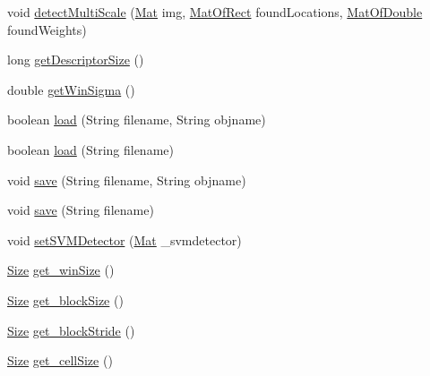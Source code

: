 \begin{DoxyCompactItemize}
\item 
void \mbox{\hyperlink{classorg_1_1opencv_1_1objdetect_1_1_h_o_g_descriptor_a0792b6a9193c0bddb4d8a33b54c466f1}{detect\+Multi\+Scale}} (\mbox{\hyperlink{classorg_1_1opencv_1_1core_1_1_mat}{Mat}} img, \mbox{\hyperlink{classorg_1_1opencv_1_1core_1_1_mat_of_rect}{Mat\+Of\+Rect}} found\+Locations, \mbox{\hyperlink{classorg_1_1opencv_1_1core_1_1_mat_of_double}{Mat\+Of\+Double}} found\+Weights)
\item 
long \mbox{\hyperlink{classorg_1_1opencv_1_1objdetect_1_1_h_o_g_descriptor_abb6efea36d4eb6d8d7f90d1525607210}{get\+Descriptor\+Size}} ()
\item 
double \mbox{\hyperlink{classorg_1_1opencv_1_1objdetect_1_1_h_o_g_descriptor_a811c982f6e07fbd77b6108afd9d6359c}{get\+Win\+Sigma}} ()
\item 
boolean \mbox{\hyperlink{classorg_1_1opencv_1_1objdetect_1_1_h_o_g_descriptor_ac381a148646d8c5a288b455bf3fb2564}{load}} (String filename, String objname)
\item 
boolean \mbox{\hyperlink{classorg_1_1opencv_1_1objdetect_1_1_h_o_g_descriptor_ab2806693fd58b1d2fa516c8c83a29225}{load}} (String filename)
\item 
void \mbox{\hyperlink{classorg_1_1opencv_1_1objdetect_1_1_h_o_g_descriptor_abe9384643a31fac6dc886b801a2fb15f}{save}} (String filename, String objname)
\item 
void \mbox{\hyperlink{classorg_1_1opencv_1_1objdetect_1_1_h_o_g_descriptor_ad6bb39073db4e5da7401f8f7338f1c36}{save}} (String filename)
\item 
void \mbox{\hyperlink{classorg_1_1opencv_1_1objdetect_1_1_h_o_g_descriptor_add61bdd56b6d457cc5b9355fa555a384}{set\+S\+V\+M\+Detector}} (\mbox{\hyperlink{classorg_1_1opencv_1_1core_1_1_mat}{Mat}} \+\_\+svmdetector)
\item 
\mbox{\hyperlink{classorg_1_1opencv_1_1core_1_1_size}{Size}} \mbox{\hyperlink{classorg_1_1opencv_1_1objdetect_1_1_h_o_g_descriptor_af357f403e6c033e1555d2332b315ee57}{get\+\_\+win\+Size}} ()
\item 
\mbox{\hyperlink{classorg_1_1opencv_1_1core_1_1_size}{Size}} \mbox{\hyperlink{classorg_1_1opencv_1_1objdetect_1_1_h_o_g_descriptor_adecd55f3c1025e3395ef576ff2a1bb47}{get\+\_\+block\+Size}} ()
\item 
\mbox{\hyperlink{classorg_1_1opencv_1_1core_1_1_size}{Size}} \mbox{\hyperlink{classorg_1_1opencv_1_1objdetect_1_1_h_o_g_descriptor_a56d8676505cc47ed53eb50fbdfd5ffea}{get\+\_\+block\+Stride}} ()
\item 
\mbox{\hyperlink{classorg_1_1opencv_1_1core_1_1_size}{Size}} \mbox{\hyperlink{classorg_1_1opencv_1_1objdetect_1_1_h_o_g_descriptor_accb396f7b6d98d0796bb1eeb8f1f6bcb}{get\+\_\+cell\+Size}} ()

\end{DoxyCompactItemize}
